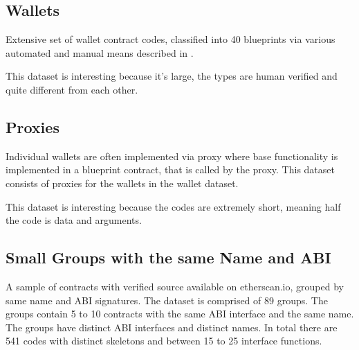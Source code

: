 \documentclass[../main.tex]{subfiles}
\begin{document}
\subsection{Wallets}
Extensive set of wallet contract codes, classified into 40 blueprints via various automated and manual means described in .

This dataset is interesting because it's large, the types are human verified and quite different from each other.

\subsection{Proxies}
Individual wallets are often implemented via proxy where base functionality is implemented in a blueprint contract, that is called by the proxy. This dataset consists of proxies for the wallets in the wallet dataset.

This dataset is interesting because the codes are extremely short, meaning half the code is data and arguments.

\subsection{Small Groups with the same Name and ABI}
A sample of contracts with verified source available on etherscan.io, grouped by same name and ABI signatures. The dataset is comprised of 89 groups. The groups contain 5 to 10 contracts with the same ABI interface and the same name. The groups have distinct ABI interfaces and distinct names.
In total there are 541 codes with distinct skeletons and between 15 to 25 interface functions.
\end{document}
